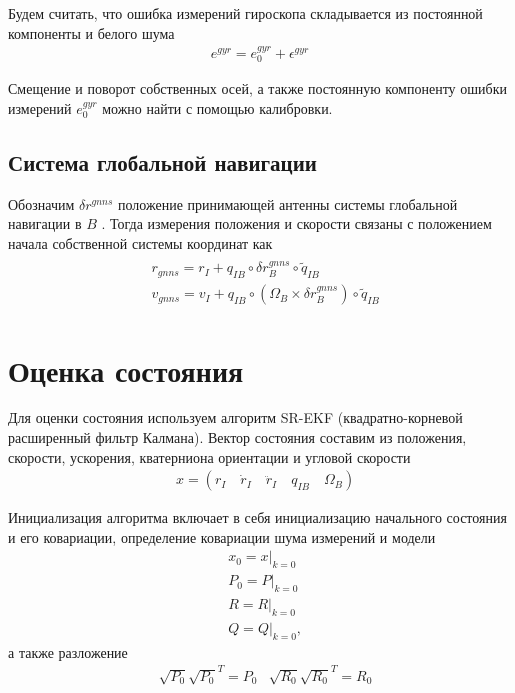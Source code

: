 \documentclass[a4paper,12pt]{article}
\begin{document}
Будем считать, что ошибка измерений гироскопа складывается из постоянной компоненты  и белого шума
\begin{align} 
e^{\textit{gyr}} = e_{0}^{\textit{gyr}} + \epsilon^{\textit{gyr}}
\end{align}

Смещение и поворот собственных осей, а также постоянную компоненту ошибки измерений $e_{0}^{\textit{gyr}}$ можно найти с помощью калибровки.

\subsection{Система глобальной навигации}
Обозначим $\delta r^{gnns}$ положение принимающей антенны системы глобальной навигации в $B$ . Тогда измерения положения и скорости связаны с положением начала собственной системы координат как
\begin{align} \label{eq:gnns_mes_model}
\begin{split}
&r_{gnns} = r_I + q_{IB} \circ \delta r^{gnns}_B \circ \tilde{q}_{IB} \\
&v_{gnns} = v_I + q_{IB} \circ  (\Omega_B \times \delta r^{gnns}_B) \circ \tilde{q}_{IB}
\end{split}
\end{align}

\section{Оценка состояния}
Для оценки состояния используем алгоритм SR-EKF (квадратно-корневой расширенный фильтр Калмана). Вектор состояния составим из положения, скорости, ускорения, кватерниона ориентации и угловой скорости
\begin{align} 
&x = (r_I \quad \dot{r}_I \quad \ddot{r}_I \quad q_{IB} \quad \Omega_B)
\end{align}

Инициализация алгоритма включает в себя инициализацию начального состояния и его ковариации, определение ковариации шума измерений и модели
\begin{align}
&x_0 = x|_{k=0} \\
&P_0 = P|_{k=0} \\
&R = R|_{k=0} \\
&Q = Q|_{k=0},
\end{align} 
а также разложение
\begin{align}
&\sqrt{P_0} \sqrt{P_0}^T= P_0
&\sqrt{R_0} \sqrt{R_0}^T= R_0
\end{align} 
\end{document}
